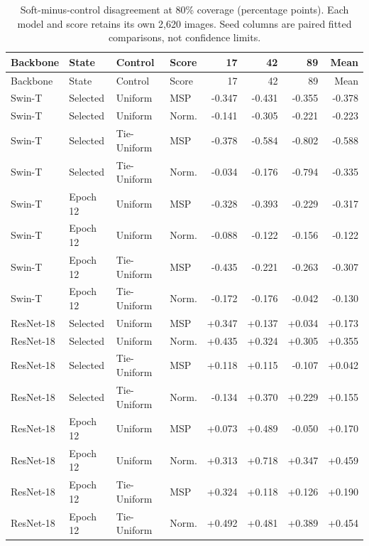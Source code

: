 \begingroup\small\setlength{\tabcolsep}{4pt}\setlength{\LTcapwidth}{\linewidth}\renewcommand{\arraystretch}{.97}
\begin{longtable}{llllrrrr}
\caption{Soft-minus-control disagreement at 80\% coverage (percentage points). Each model and score retains its own 2,620 images. Seed columns are paired fitted comparisons, not confidence limits.}\label{tab:normalization-seeds}\\
\toprule Backbone & State & Control & Score & 17 & 42 & 89 & Mean\\\midrule\endfirsthead
\toprule Backbone & State & Control & Score & 17 & 42 & 89 & Mean\\\midrule\endhead
Swin-T & Selected & Uniform & MSP & -0.347 & -0.431 & -0.355 & -0.378\\
Swin-T & Selected & Uniform & Norm. & -0.141 & -0.305 & -0.221 & -0.223\\
Swin-T & Selected & Tie-Uniform & MSP & -0.378 & -0.584 & -0.802 & -0.588\\
Swin-T & Selected & Tie-Uniform & Norm. & -0.034 & -0.176 & -0.794 & -0.335\\
Swin-T & Epoch 12 & Uniform & MSP & -0.328 & -0.393 & -0.229 & -0.317\\
Swin-T & Epoch 12 & Uniform & Norm. & -0.088 & -0.122 & -0.156 & -0.122\\
Swin-T & Epoch 12 & Tie-Uniform & MSP & -0.435 & -0.221 & -0.263 & -0.307\\
Swin-T & Epoch 12 & Tie-Uniform & Norm. & -0.172 & -0.176 & -0.042 & -0.130\\
ResNet-18 & Selected & Uniform & MSP & +0.347 & +0.137 & +0.034 & +0.173\\
ResNet-18 & Selected & Uniform & Norm. & +0.435 & +0.324 & +0.305 & +0.355\\
ResNet-18 & Selected & Tie-Uniform & MSP & +0.118 & +0.115 & -0.107 & +0.042\\
ResNet-18 & Selected & Tie-Uniform & Norm. & -0.134 & +0.370 & +0.229 & +0.155\\
ResNet-18 & Epoch 12 & Uniform & MSP & +0.073 & +0.489 & -0.050 & +0.170\\
ResNet-18 & Epoch 12 & Uniform & Norm. & +0.313 & +0.718 & +0.347 & +0.459\\
ResNet-18 & Epoch 12 & Tie-Uniform & MSP & +0.324 & +0.118 & +0.126 & +0.190\\
ResNet-18 & Epoch 12 & Tie-Uniform & Norm. & +0.492 & +0.481 & +0.389 & +0.454\\
\bottomrule\end{longtable}\endgroup

